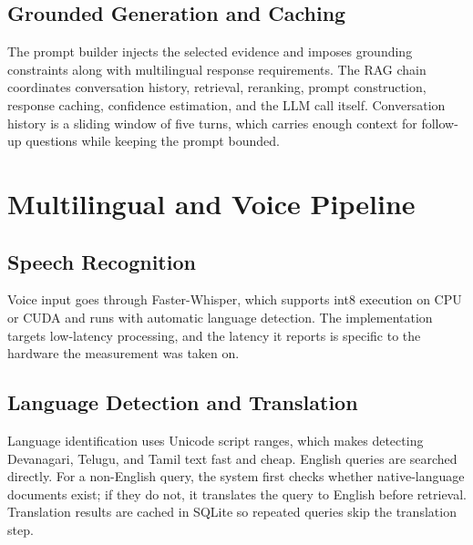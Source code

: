 \documentclass[10pt,twocolumn,letterpaper]{article}
\begin{document}
\subsection{Grounded Generation and Caching}
The prompt builder injects the selected evidence and imposes grounding constraints along with multilingual response requirements. The RAG chain coordinates conversation history, retrieval, reranking, prompt construction, response caching, confidence estimation, and the LLM call itself. Conversation history is a sliding window of five turns, which carries enough context for follow-up questions while keeping the prompt bounded.

\section{Multilingual and Voice Pipeline}
\subsection{Speech Recognition}
Voice input goes through Faster-Whisper, which supports int8 execution on CPU or CUDA and runs with automatic language detection. The implementation targets low-latency processing, and the latency it reports is specific to the hardware the measurement was taken on.

\subsection{Language Detection and Translation}
Language identification uses Unicode script ranges, which makes detecting Devanagari, Telugu, and Tamil text fast and cheap. English queries are searched directly. For a non-English query, the system first checks whether native-language documents exist; if they do not, it translates the query to English before retrieval. Translation results are cached in SQLite so repeated queries skip the translation step.
\end{document}
